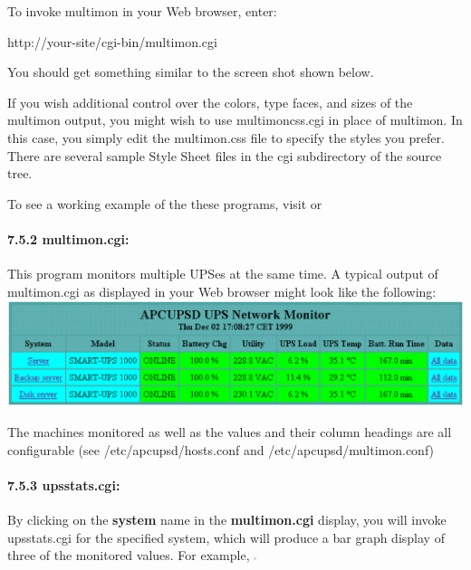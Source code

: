 To invoke multimon in your Web browser, enter:  

http://\lt{}your-site\gt{}/cgi-bin/multimon.cgi  

You should get something similar to the screen shot shown below.  

If you wish additional control over the colors, type faces, and sizes of the
multimon output, you might wish to use multimoncss.cgi in place of multimon.
In this case, you simply edit the multimon.css file to specify the styles you
prefer.  There are several sample Style Sheet files in the cgi subdirectory of
the source tree.  

To see a working example of the these programs, visit 
 or 

\label{multimon_005fcgi}

\paragraph*{7.5.2 multimon.cgi:}

\label{index-multimon-126}
\label{index-CGI_002c-multimon-127}
This program monitors multiple UPSes at the same time. A typical output of
multimon.cgi as displayed in your Web browser might look like the following: 
\includegraphics{./multimon.eps}  

The machines monitored as well as the values and their column headings are all
configurable (see /etc/apcupsd/hosts.conf and /etc/apcupsd/multimon.conf) 

\label{upsstats_005fcgi}

\paragraph*{7.5.3 upsstats.cgi:}

\label{index-upsstats-128}
\label{index-CGI_002c-upsstats-129}
By clicking on the {\bf system} name in the {\bf multimon.cgi} display, you
will invoke upsstats.cgi for the specified system, which will produce a bar
graph display of three of the monitored values. For example, 
\includegraphics{./status.eps}  

